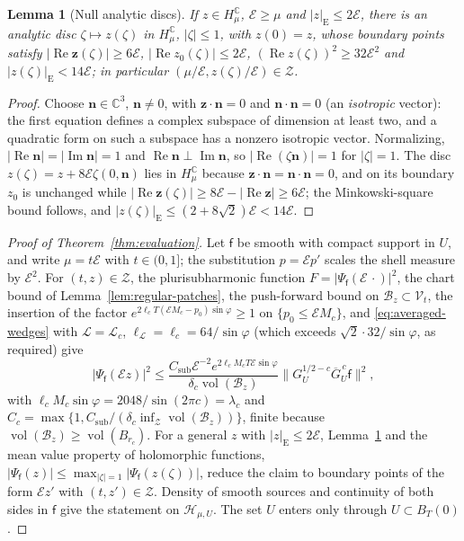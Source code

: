 \documentclass[aps,prl,reprint,longbibliography,raggedbottom]{revtex4-2}
\newtheorem{lemma}{Lemma}
\newcommand{\C}{\mathbb C}
\newcommand{\norm}[1]{\lVert #1\rVert}
\newcommand{\abs}[1]{\lvert #1\rvert}
\DeclareMathOperator{\Rea}{Re}
\DeclareMathOperator{\Ima}{Im}
\DeclareMathOperator{\vol}{vol}
\newcommand{\Hh}{\mathcal H}
\newcommand{\sx}{\mathsf f}
\newcommand{\bz}{\mathbf z}
\newcommand{\Energy}{\mathcal E}
\begin{document}
\begin{lemma}[Null analytic discs]\label{lem:null-discs}
If $z\in H_\mu^{\C}$, $\Energy\ge\mu$ and $\abs z_{\mathrm E}\le2\Energy$,
there is an analytic disc $\zeta\mapsto z(\zeta)$ in $H_\mu^{\C}$,
$\abs\zeta\le1$, with $z(0)=z$, whose boundary points satisfy
$\abs{\Rea\bz(\zeta)}\ge6\Energy$, $\abs{\Rea z_0(\zeta)}\le2\Energy$,
$(\Rea z(\zeta))^2\ge32\Energy^2$ and $\abs{z(\zeta)}_{\mathrm E}<14\Energy$;
in particular $(\mu/\Energy,z(\zeta)/\Energy)\in\mathscr Z$.
\end{lemma}

\begin{proof}
Choose $\mathbf n\in\C^3$, $\mathbf n\ne0$, with $\bz\cdot\mathbf n=0$
and $\mathbf n\cdot\mathbf n=0$ (an \emph{isotropic} vector): the
first equation defines a complex subspace of dimension at least two,
and a quadratic form on such a subspace has a nonzero isotropic
vector. Normalizing, $\abs{\Rea\mathbf n}=\abs{\Ima\mathbf n}=1$ and
$\Rea\mathbf n\perp\Ima\mathbf n$, so $\abs{\Rea(\zeta\mathbf n)}=1$
for $\abs\zeta=1$. The disc $z(\zeta)=z+8\Energy\zeta(0,\mathbf n)$ lies
in $H_\mu^{\C}$ because $\bz\cdot\mathbf n=\mathbf n\cdot\mathbf n=0$,
and on its boundary $z_0$ is unchanged while
$\abs{\Rea\bz(\zeta)}\ge8\Energy-\abs{\Rea\bz}\ge6\Energy$; the
Minkowski-square bound follows, and
$\abs{z(\zeta)}_{\mathrm E}\le(2+8\sqrt2)\Energy<14\Energy$.
\end{proof}

\begin{proof}[Proof of Theorem~\ref{thm:evaluation}]
Let $\sx$ be smooth with compact support in $U$, and write
$\mu=t\Energy$ with $t\in(0,1]$; the substitution $p=\Energy p'$ scales
the shell measure by $\Energy^2$. For $(t,z)\in\mathscr Z$, the
plurisubharmonic function $F=\abs{\Psi_\sx(\Energy\,\cdot)}^2$, the chart
bound of Lemma~\ref{lem:regular-patches}, the push-forward bound on
$\mathcal B_z\subset\mathcal V_t$, the insertion of the factor
$e^{2\ell_cT(\Energy M_c-p_0)\sin\varphi}\ge1$ on $\{p_0\le\Energy M_c\}$, and
\eqref{eq:averaged-wedges} with $\mathscr L=\mathscr L_c$,
$\ell_{\mathscr L}=\ell_c=64/\sin\varphi$ (which exceeds
$\sqrt2\cdot32/\sin\varphi$, as required) give
\[
\abs{\Psi_\sx(\Energy z)}^2
\le\frac{C_{\mathrm{sub}}\Energy^{-2}e^{2\ell_cM_cT\Energy\sin\varphi}}
{\delta_c\vol(\mathcal B_z)}
\norm{G_U^{1/2-c}\overline G_U^{\,c}\sx}^2,
\]
with $\ell_cM_c\sin\varphi=2048/\sin(2\pi c)=\lambda_c$ and
$C_c=\max\{1,C_{\mathrm{sub}}/(\delta_c\inf_{\mathscr Z}\vol(\mathcal B_z))\}$,
finite because $\vol(\mathcal B_z)\ge\vol(B_{r_c})$. For a general $z$ with
$\abs z_{\mathrm E}\le2\Energy$, Lemma~\ref{lem:null-discs} and the mean
value property of holomorphic functions,
$\abs{\Psi_\sx(z)}\le\max_{\abs\zeta=1}\abs{\Psi_\sx(z(\zeta))}$,
reduce the claim to boundary points of the form $\Energy z'$ with
$(t,z')\in\mathscr Z$.
Density of smooth sources and continuity of both sides in $\sx$ give
the statement on $\Hh_{\mu,U}$. The set $U$ enters only through
$U\subset B_T(0)$.
\end{proof}
\end{document}
